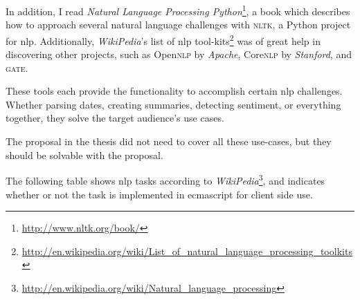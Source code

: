 In addition, I read \emph{Natural Language Processing Python}\footnote{
    \url{http://www.nltk.org/book/}
  }, a book which describes how to approach several natural language
  challenges with \textsc{nltk}, a Python project for \gls{nlp}.
Additionally, \emph{WikiPedia}'s list of \gls{nlp} tool-kits\footnote{
    \url{http://en.wikipedia.org/wiki/List_of_natural_language_processing_toolkits}
  } was of great help in discovering other projects, such as Open\textsc{nlp}
  by \emph{Apache}, Core\textsc{nlp} by \emph{Stanford}, and \textsc{gate}.

These tools each provide the functionality to accomplish certain \gls{nlp}
  challenges.
Whether parsing dates, creating summaries, detecting sentiment, or everything
  together, they solve the target audience's use cases.

The proposal in the thesis did not need to cover all these use-cases, but
  they should be solvable with the proposal.

The following table shows \gls{nlp} tasks according to
  \emph{WikiPedia}\footnote{
    \url{http://en.wikipedia.org/wiki/Natural_language_processing}
  }, and indicates whether or not the task is implemented in
  \gls{ecmascript} for client side use.

\medskip

